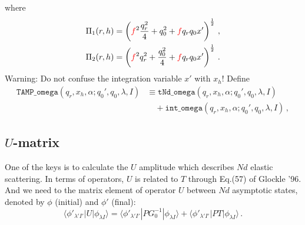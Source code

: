 \documentclass[11pt,aps]{revtex4}
\newcommand{\PF}{{\color{red}f}}
\newcommand{\orig}[1]{{\color{red} #1 }}
\newcommand{\cmplx}[1]{{\color{red} #1 }}
\begin{document}

where
\begin{equation}
\begin{split}
  \Pi_1(r, h) &= \left(\PF^2 \frac{q_r^2}{4} + q_0^2 + \PF q_r q_0 x' \right)^{\frac{1}{2}} \, ,\\
  \Pi_2(r, h) &= \left(\PF^2 q_r^2 + \frac{q_0^2}{4} + \PF q_r q_0 x' \right)^{\frac{1}{2}} \, .
\end{split}
\end{equation}
Warning: Do not confuse the integration variable $x'$ with $x_h$!
Define
\begin{equation}
\begin{split}
\texttt{TAMP\_omega}\left(q_r, x_h, \alpha; q_0', q_0, \lambda, I\right) &\equiv \texttt{tNd\_omega}\left(q_r, x_h, \alpha; q_0', q_0, \lambda, I\right) \\
& \quad + \texttt{int\_omega}\left(q_r, x_h, \alpha; q_0', q_0, \lambda, I\right) \, ,
\end{split}
\end{equation}


\subsection{$U$-matrix}

One of the keys is to calculate the $U$ amplitude which describes $N d$ elastic scattering. In terms of operators, $U$ is related to $T$ through Eq.(57) of Glockle '96. And we need to the matrix element of operator $U$ between $N d$ asymptotic states, denoted by $\phi$ (initial) and $\phi'$ (final):
\begin{equation}
  \langle \phi'_{\lambda' I'} | U | \phi_{\lambda I} \rangle = \langle \phi'_{\lambda' I'} | P G_0^{-1} | \phi_{\lambda I} \rangle + \langle \phi'_{\lambda' I'} | P T | \phi_{\lambda I} \rangle \, .
\end{equation}
\end{document}
